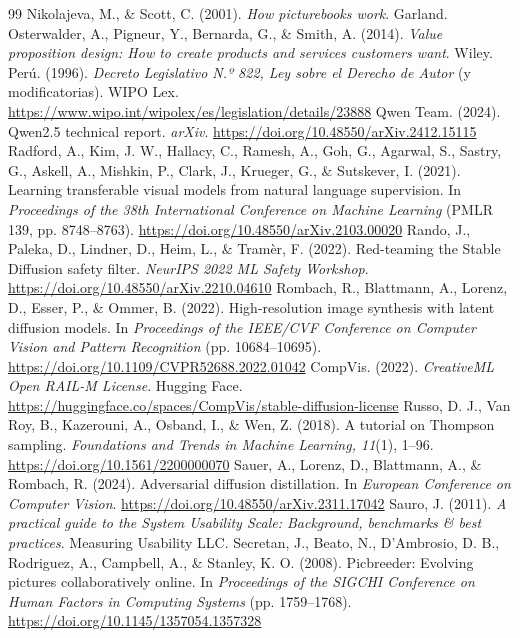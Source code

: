 \documentclass[10pt,a4paper,twocolumn]{article}
\begin{document}
{\begin{thebibliography}{99}
 Nikolajeva, M., \& Scott, C. (2001). \emph{How picturebooks work}. Garland.
 Osterwalder, A., Pigneur, Y., Bernarda, G., \& Smith, A. (2014). \emph{Value proposition design: How to create products and services customers want}. Wiley.
 Perú. (1996). \emph{Decreto Legislativo N.º 822, Ley sobre el Derecho de Autor} (y modificatorias). WIPO Lex. \url{https://www.wipo.int/wipolex/es/legislation/details/23888}
 Qwen Team. (2024). Qwen2.5 technical report. \emph{arXiv}. \url{https://doi.org/10.48550/arXiv.2412.15115}
 Radford, A., Kim, J. W., Hallacy, C., Ramesh, A., Goh, G., Agarwal, S., Sastry, G., Askell, A., Mishkin, P., Clark, J., Krueger, G., \& Sutskever, I. (2021). Learning transferable visual models from natural language supervision. In \emph{Proceedings of the 38th International Conference on Machine Learning} (PMLR 139, pp. 8748--8763). \url{https://doi.org/10.48550/arXiv.2103.00020}
 Rando, J., Paleka, D., Lindner, D., Heim, L., \& Tramèr, F. (2022). Red-teaming the Stable Diffusion safety filter. \emph{NeurIPS 2022 ML Safety Workshop}. \url{https://doi.org/10.48550/arXiv.2210.04610}
 Rombach, R., Blattmann, A., Lorenz, D., Esser, P., \& Ommer, B. (2022). High-resolution image synthesis with latent diffusion models. In \emph{Proceedings of the IEEE/CVF Conference on Computer Vision and Pattern Recognition} (pp. 10684--10695). \url{https://doi.org/10.1109/CVPR52688.2022.01042}
 CompVis. (2022). \emph{CreativeML Open RAIL-M License}. Hugging Face. \url{https://huggingface.co/spaces/CompVis/stable-diffusion-license}
 Russo, D. J., Van Roy, B., Kazerouni, A., Osband, I., \& Wen, Z. (2018). A tutorial on Thompson sampling. \emph{Foundations and Trends in Machine Learning, 11}(1), 1--96. \url{https://doi.org/10.1561/2200000070}
 Sauer, A., Lorenz, D., Blattmann, A., \& Rombach, R. (2024). Adversarial diffusion distillation. In \emph{European Conference on Computer Vision}. \url{https://doi.org/10.48550/arXiv.2311.17042}
 Sauro, J. (2011). \emph{A practical guide to the System Usability Scale: Background, benchmarks \& best practices}. Measuring Usability LLC.
 Secretan, J., Beato, N., D'Ambrosio, D. B., Rodriguez, A., Campbell, A., \& Stanley, K. O. (2008). Picbreeder: Evolving pictures collaboratively online. In \emph{Proceedings of the SIGCHI Conference on Human Factors in Computing Systems} (pp. 1759--1768). \url{https://doi.org/10.1145/1357054.1357328}

\end{thebibliography}}
\end{document}
